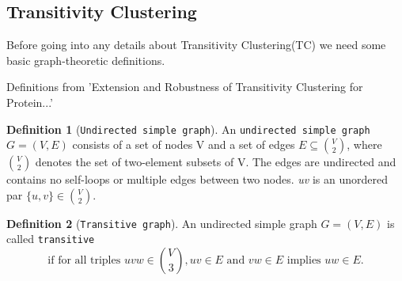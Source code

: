 \documentclass[a4paper,10pt]{article}
\theoremstyle{plain}
\theoremstyle{definition}
\newtheorem{defn}{Definition}
\begin{document}
\subsection{Transitivity Clustering}

Before going into any details about Transitivity Clustering(TC) we need some basic graph-theoretic definitions.
\begin{description}
	\item[Definitions from 'Extension and Robustness of Transitivity Clustering for Protein...']
\end{description}

\begin{defn}[\texttt{Undirected simple graph}]\label{def:Undirected simple graph}
	An \texttt{undirected simple graph} $G = (V, E)$ consists of a set of nodes V and a set of edges $E \subseteq {V \choose 2}$, where ${V \choose 2}$ denotes the set of two-element subsets of V. The edges are undirected and contains no self-loops or multiple edges between two nodes. \textit{uv} is an unordered par $\{u, v \} \in {V \choose 2}$.
\end{defn}

\begin{defn}[\texttt{Transitive graph}]\label{def:Transitive graph}
	An undirected simple graph $G = (V, E)$ is called \texttt{transitive} 
	\begin{equation*}
	\text{if for all triples } uvw \in {V \choose 3}, uv \in E \text{ and } vw \in E \text{ implies } uw \in E.
	\end{equation*}
\end{defn}
\end{document}
